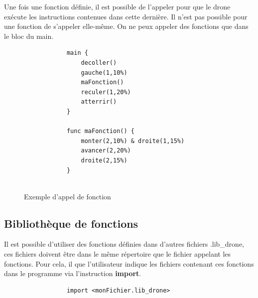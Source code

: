 \documentclass[12pt, openany]{report}
\begin{document}
Une fois une fonction définie, il est possible de l'appeler pour que le drone exécute les instructions contenues dans cette dernière. Il n'est pas possible pour une fonction de s'appeler elle-même.
On ne peux appeler des fonctions que dans le bloc du main.

    \begin{figure}[h!]
        \begin{center}
            \begin{Verbatim}
            main {
                decoller()
                gauche(1,10%)
                maFonction()
                reculer(1,20%)
                atterrir()
            }
                
            func maFonction() {
                monter(2,10%) & droite(1,15%)
                avancer(2,20%)
                droite(2,15%)
            }
            
            \end{Verbatim}
        \end{center}
        \caption{Exemple d'appel de fonction}
        \label{Exemple d'appel de fonction}
    \end{figure}
    
\newpage

\subsection{Bibliothèque de fonctions}
Il est possible d'utiliser des fonctions définies dans d'autres fichiers .lib\_drone, ces fichiers doivent être dans le même répertoire que le fichier appelant les fonctions.
Pour cela, il que l'utilisateur indique les fichiers contenant ces fonctions dans le programme via l'instruction \textbf{import}.

    \begin{figure}[h!]
        \begin{center}
            \begin{Verbatim}
            import <monFichier.lib_drone>
            \end{Verbatim}
        \end{center}
    \end{figure}
\end{document}
